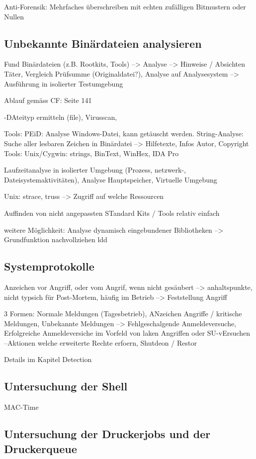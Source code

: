 Anti-Forensik: Mehrfaches überschreiben mit echten zufälligen Bitmustern oder Nullen

\subsection{Unbekannte Binärdateien analysieren}
Fund Binärdateien (z.B. Rootkits, Tools) --> Analyse --> Hinweise / Absichten Täter, Vergleich Prüfsumme (Originaldatei?), Analyse auf Analysesystem --> Ausführung in isolierter Testumgebung

Ablauf gemäss CF: Seite 141

-DAteityp ermitteln (file), Virusscan, 

Tools: PEiD: Analyse Windows-Datei, kann getäuscht werden.
String-Analyse: Suche aller lesbaren Zeichen in Binärdatei --> Hilfetexte, Infos Autor, Copyright
Tools: Unix/Cygwin: strings, BinText, WinHex, IDA Pro

Laufzeitanalyse in isolierter Umgebung (Prozess, netzwerk-, Dateisystemaktivitäten), Analyse Hauptspeicher, Virtuelle Umgebung

Unix: strace, truss --> Zugriff auf welche Ressourcen

Auffinden von nicht angepassten STandard Kits / Tools relativ einfach

weitere Möglichkeit: Analyse dynamisch eingebundener Bibliotheken --> Grundfunktion nachvollziehen
ldd

\subsection{Systemprotokolle}
Anzeichen vor Angriff, oder vom Angrif, wenn nicht gesäubert --> anhaltspunkte, nicht typsich für Post-Mortem, häufig im Betrieb --> Feststellung Angriff

3 Formen: Normale Meldungen (Tagesbetrieb), ANzeichen Angriffe / kritische Meldungen, Unbekannte Meldungen
--> Fehlgeschalgende Anmeldeversuche, Erfolgreiche Anmeldeversiche im Vorfeld von laken Angriffen oder SU-vErsuchen
--Aktionen welche erweiterte Rechte erfoern, Shutdeon / Restor

Details im Kapitel Detection


\subsection{Untersuchung der Shell}
MAC-Time

\subsection{Untersuchung der Druckerjobs und der Druckerqueue}

